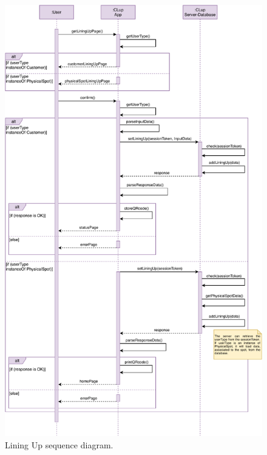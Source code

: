 \begin{figure}[H]
	\centering
	\includegraphics[width=1.0\textwidth]{images/liningUp_sequence_diagram.pdf}
	\caption{Lining Up sequence diagram.}
\end{figure}

